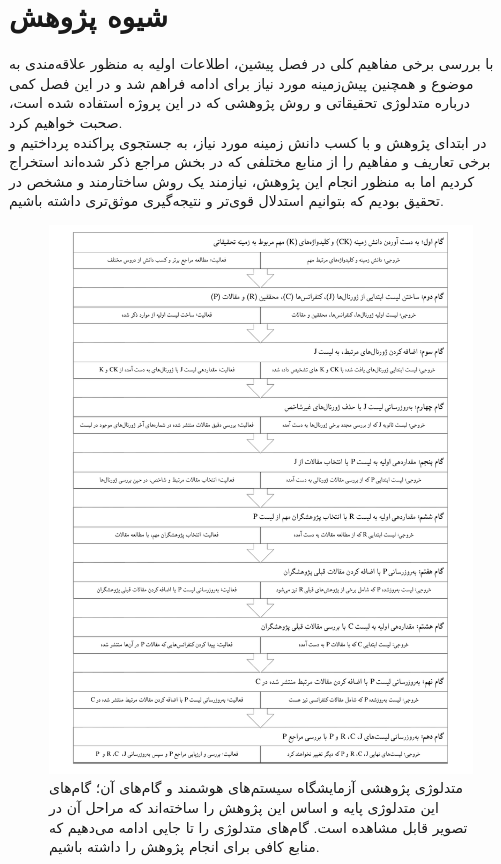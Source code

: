 \chapter{شیوه پژوهش‌}
با بررسی برخی مفاهیم کلی در فصل پیشین، اطلاعات اولیه به منظور علاقه‌مندی به موضوع و همچنین پیش‌زمینه مورد نیاز برای ادامه فراهم شد و در این فصل کمی درباره متدلوژی تحقیقاتی و روش پژوهشی که در این پروژه استفاده شده است، صحبت خواهیم کرد.\\
در ابتدای پژوهش و با کسب دانش ‌زمینه مورد نیاز، به جستجوی پراکنده پرداختیم و برخی تعاریف و مفاهیم را از منابع مختلفی که در بخش مراجع ذکر شده‌اند استخراج کردیم اما به منظور انجام این پژوهش، نیازمند یک روش ساختارمند و مشخص در تحقیق بودیم که بتوانیم استدلال قوی‌تر و نتیجه‌گیری موثق‌تری داشته باشیم.
\begin{figure}
	\centering\includegraphics[width=\linewidth]{Resources/ISLAB_methodology.pdf}
	\caption[متدلوژی پژوهشی آزمایشگاه سیستم‌های هوشمند و گام‌های آن]
	{متدلوژی پژوهشی آزمایشگاه سیستم‌های هوشمند و گام‌های آن؛ گام‌های این متدلوژی پایه و اساس این پژوهش را ساخته‌اند که مراحل آن در تصویر قابل مشاهده است. گام‌های متدلوژی را تا جایی ادامه می‌دهیم که منابع کافی برای انجام پژوهش را داشته باشیم.}
	\label{fig:islab}
\end{figure}
